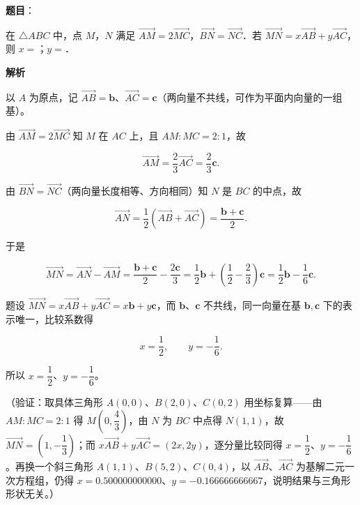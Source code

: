 \begin{answer}

\textbf{题目}：

在 \(\triangle ABC\) 中，点 \(M\)，\(N\) 满足 \(\overrightarrow{AM}=2\overrightarrow{MC}\)，\(\overrightarrow{BN}=\overrightarrow{NC}\)．若 \(\overrightarrow{MN}=x\overrightarrow{AB}+y\overrightarrow{AC}\)，则 \(x=\)\gkblank{}；\(y=\)\gkblank{}．

\textbf{解析}

以 \(A\) 为原点，记 \(\overrightarrow{AB}=\mathbf{b}\)、\(\overrightarrow{AC}=\mathbf{c}\)（两向量不共线，可作为平面内向量的一组基）。

由 \(\overrightarrow{AM}=2\overrightarrow{MC}\) 知 \(M\) 在 \(AC\) 上，且 \(AM:MC=2:1\)，故

\nopagebreak[4]
\[
\overrightarrow{AM}=\frac{2}{3}\overrightarrow{AC}=\frac{2}{3}\mathbf{c}.
\]

由 \(\overrightarrow{BN}=\overrightarrow{NC}\)（两向量长度相等、方向相同）知 \(N\) 是 \(BC\) 的中点，故

\nopagebreak[4]
\[
\overrightarrow{AN}=\frac{1}{2}\left(\overrightarrow{AB}+\overrightarrow{AC}\right)=\frac{\mathbf{b}+\mathbf{c}}{2}.
\]

于是

\nopagebreak[4]
\[
\overrightarrow{MN}=\overrightarrow{AN}-\overrightarrow{AM}=\frac{\mathbf{b}+\mathbf{c}}{2}-\frac{2\mathbf{c}}{3}=\frac{1}{2}\mathbf{b}+\left(\frac{1}{2}-\frac{2}{3}\right)\mathbf{c}=\frac{1}{2}\mathbf{b}-\frac{1}{6}\mathbf{c}.
\]

题设 \(\overrightarrow{MN}=x\overrightarrow{AB}+y\overrightarrow{AC}=x\mathbf{b}+y\mathbf{c}\)，而 \(\mathbf{b}\)、\(\mathbf{c}\) 不共线，同一向量在基 \(\mathbf{b},\mathbf{c}\) 下的表示唯一，比较系数得

\nopagebreak[4]
\[
x=\frac{1}{2},\qquad y=-\frac{1}{6}.
\]

所以 \(x=\dfrac{1}{2}\)、\(y=-\dfrac{1}{6}\)。

（验证：取具体三角形 \(A(0,0)\)、\(B(2,0)\)、\(C(0,2)\) 用坐标复算——由 \(AM:MC=2:1\) 得 \(M\left(0,\dfrac{4}{3}\right)\)，由 \(N\) 为 \(BC\) 中点得 \(N(1,1)\)，故 \(\overrightarrow{MN}=\left(1,-\dfrac{1}{3}\right)\)；而 \(x\overrightarrow{AB}+y\overrightarrow{AC}=(2x,2y)\)，逐分量比较同得 \(x=\dfrac{1}{2}\)、\(y=-\dfrac{1}{6}\)。再换一个斜三角形 \(A(1,1)\)、\(B(5,2)\)、\(C(0,4)\)，以 \(\overrightarrow{AB}\)、\(\overrightarrow{AC}\) 为基解二元一次方程组，仍得 \(x=0.500000000000\)、\(y=-0.166666666667\)，说明结果与三角形形状无关。）


\end{answer}
